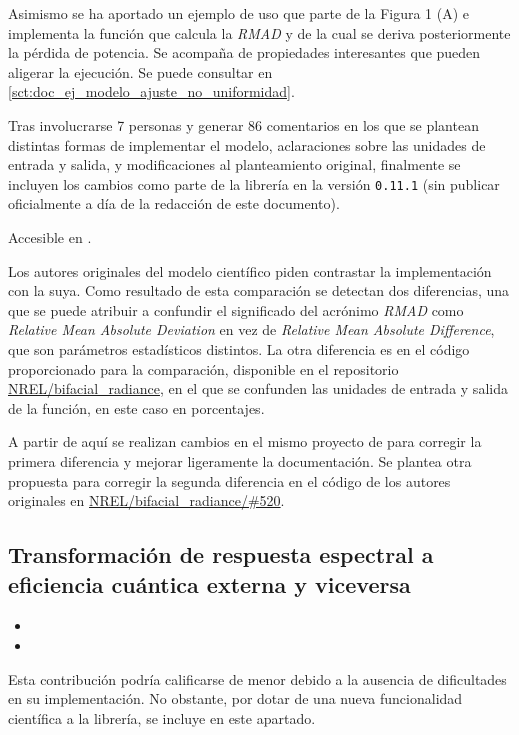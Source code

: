 Asimismo se ha aportado un ejemplo de uso que parte de la Figura 1 (A) e implementa la función que calcula la \textit{RMAD} y de la cual se deriva posteriormente la pérdida de potencia. Se acompaña de propiedades interesantes que pueden aligerar la ejecución. Se puede consultar en \ref{sct:doc_ej_modelo_ajuste_no_uniformidad}.

Tras involucrarse 7 personas y generar 86 comentarios en los que se plantean distintas formas de implementar el modelo, aclaraciones sobre las unidades de entrada y salida, y modificaciones al planteamiento original, finalmente se incluyen los cambios como parte de la librería en la versión \texttt{0.11.1} (sin publicar oficialmente a día de la redacción de este documento).

Accesible en .

Los autores originales del modelo científico piden contrastar la implementación con la suya. Como resultado de esta comparación se detectan dos diferencias, una que se puede atribuir a confundir el significado del acrónimo \textit{RMAD} como \textit{Relative Mean Absolute Deviation} en vez de \textit{Relative Mean Absolute Difference}, que son parámetros estadísticos distintos. La otra diferencia es en el código proporcionado para la comparación, disponible en el repositorio \href{https://github.com/NREL/bifacial_radiance/}{NREL/bifacial\_radiance}, en el que se confunden las unidades de entrada y salida de la función, en este caso en porcentajes.

A partir de aquí se realizan cambios en el mismo proyecto de \pvlibpy{} para corregir la primera diferencia y mejorar ligeramente la documentación. Se plantea otra propuesta para corregir la segunda diferencia en el código de los autores originales en \href{https://github.com/NREL/bifacial_radiance/pull/520}{NREL/bifacial\_radiance/\#520}.

\subsection{Transformación de respuesta espectral a eficiencia cuántica externa y viceversa}

\begin{itemize}
    \item {}
    \item {}
\end{itemize}

Esta contribución podría calificarse de menor debido a la ausencia de dificultades en su implementación. No obstante, por dotar de una nueva funcionalidad científica a la librería, se incluye en este apartado.

